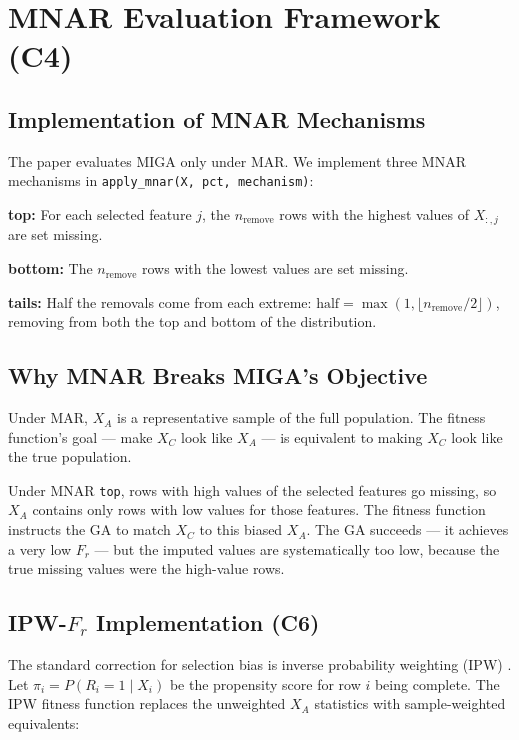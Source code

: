 \section{MNAR Evaluation Framework (C4)}

\subsection{Implementation of MNAR Mechanisms}

The paper evaluates MIGA only under MAR. We implement three MNAR mechanisms in \texttt{apply\_mnar(X, pct, mechanism)}:

\textbf{top:} For each selected feature $j$, the $n_{\text{remove}}$ rows with the highest values of $X_{:,j}$ are set missing.

\textbf{bottom:} The $n_{\text{remove}}$ rows with the lowest values are set missing.

\textbf{tails:} Half the removals come from each extreme: $\text{half} = \max(1, \lfloor n_{\text{remove}}/2 \rfloor)$, removing from both the top and bottom of the distribution.

\subsection{Why MNAR Breaks MIGA's Objective}

Under MAR, $X_A$ is a representative sample of the full population. The fitness function's goal --- make $X_C$ look like $X_A$ --- is equivalent to making $X_C$ look like the true population.

Under MNAR \texttt{top}, rows with high values of the selected features go missing, so $X_A$ contains only rows with low values for those features. The fitness function instructs the GA to match $X_C$ to this biased $X_A$. The GA succeeds --- it achieves a very low $F_r$ --- but the imputed values are systematically too low, because the true missing values were the high-value rows.

\subsection{IPW-$F_r$ Implementation (C6)}
\label{sec:ipw_implementation}

The standard correction for selection bias is inverse probability weighting (IPW)
\cite{HorvitzThompson1952}. Let $\pi_i = P(R_i = 1 \mid X_i)$ be the propensity
score for row $i$ being complete. The IPW fitness function replaces the unweighted
$X_A$ statistics with sample-weighted equivalents:

